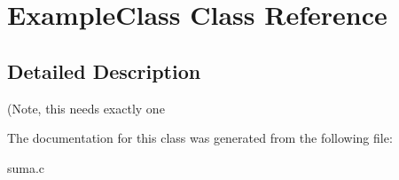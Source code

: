 \hypertarget{class_example_class}{\section{Example\+Class Class Reference}
\label{class_example_class}
}


\subsection{Detailed Description}
(Note, this needs exactly one 

The documentation for this class was generated from the following file\+:\begin{DoxyCompactItemize}
\item 
suma.\+c\end{DoxyCompactItemize}
